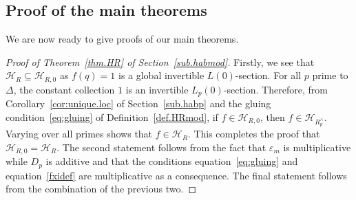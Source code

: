 \documentclass[12pt,reqno]{amsart}
\theoremstyle{definition}
\def\calH{\mathcal H}
\def\ve{\varepsilon}
\begin{document}
\subsection{Proof of the main theorems}
\label{sub.proofmain}

We are now ready to give proofs of our main theorems.

\begin{proof}[Proof of Theorem~\ref{thm.HR} of Section~\ref{sub.habmod}]
Firstly, we see that $\calH_{R}\subseteq\calH_{R,0}$ as $f(q)=1$ is a global invertible
$L(0)$-section. For all $p$ prime to $\Delta$, the constant collection
$1$ is an invertible $L_p(0)$-section. Therefore, from Corollary~\ref{cor:unique.loc}
of Section~\ref{sub.habp} and the gluing condition~\eqref{eq:gluing} of
Definition~\ref{def.HRmod}, if $f\in\calH_{R,0}$, then $f\in\calH_{R_p^\wedge}$.
Varying
over all primes shows that $f\in\calH_{R}$.
This completes the proof that $\calH_{R,0}=\calH_{R}$.
The second statement follows from the fact that $\ve_m$ is
multiplicative while $D_{p}$ is additive and that the conditions
equation~\eqref{eq:gluing} and equation~\eqref{fxidef} are multiplicative as a
consequence. The final statement follows from the combination of the previous two.
\end{proof}
\end{document}
